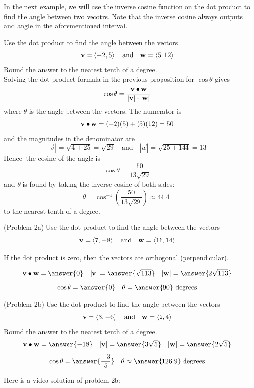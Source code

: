 \documentclass[handout]{ximera}
\begin{document}
In the next example, we will use the inverse cosine function on the dot product to find the angle between two vecotrs.
Note that the inverse cosine always outputs and angle in the aforementioned interval.
\begin{example}[Example 2] Use the dot product to find the angle between the vectors 
\[
\mathbf v = \left\langle -2,5\right\rangle \quad \text{and} \quad \mathbf w = \left\langle 5,12\right\rangle
\]
Round the answer to the nearest tenth of a degree.\\
Solving the dot product formula in the previous proposition for $\cos \theta$ gives
\[
\cos \theta = \frac{\mathbf v \bullet \mathbf w}{|\mathbf v| \cdot |\mathbf w|}
\]
where $\theta$ is the angle between the vectors. The numerator is
\[
\mathbf v \bullet \mathbf w = (-2)(5) + (5)(12) = 50
\]
and the magnitudes in the denominator are 
\[
|\vec v| = \sqrt{ 4 + 25} = \sqrt{29} \quad \text{and} \quad |\vec w| = \sqrt{25 +144 } = 13
\]
Hence, the cosine of the angle is
\[
\cos \theta = \frac{50}{13\sqrt{29}}
\]
and $\theta$ is found by taking the inverse cosine of both sides:
\[
\theta = \cos^{-1}\left(\frac{50}{13\sqrt{29}} \right) \approx 44.4^\circ
\]
to the nearest tenth of a degree.
\end{example}

\begin{problem}(Problem 2a) Use the dot product to find the angle between the vectors 
\[
\mathbf v = \left\langle 7,-8\right\rangle \quad \text{and} \quad \mathbf w = \left\langle 16,14\right\rangle
\]

\begin{hint}
If the dot product is zero, then the vectors are orthogonal (perpendicular).
\end{hint}
\[
\vec v \dotp \vec w = \answer{0} \quad |\vec v| = \answer{\sqrt{113}} \quad |\vec w| = \answer{2\sqrt{113}}
\]
\[
\cos \theta = \answer{0} \quad \theta = \answer{90} \text{ degrees}
\]
\end{problem}

\begin{problem}(Problem 2b) Use the dot product to find the angle between the vectors 
\[
\mathbf v = \left\langle 3,-6\right\rangle \quad \text{and} \quad \mathbf w = \left\langle 2,4\right\rangle
\]
Round the answer to the nearest tenth of a degree.\\
\[
\vec v \dotp \vec w = \answer{-18} \quad |\vec v| = \answer{3\sqrt{5}} \quad |\vec w| = \answer{2\sqrt{5}}
\]
\[
\cos \theta = \answer{\frac{-3}{5}} \quad \theta \approx \answer{126.9} \text{ degrees}
\]
\end{problem}

Here is a video solution of problem 2b:\\
\begin{foldable}
\end{foldable}
\end{document}
